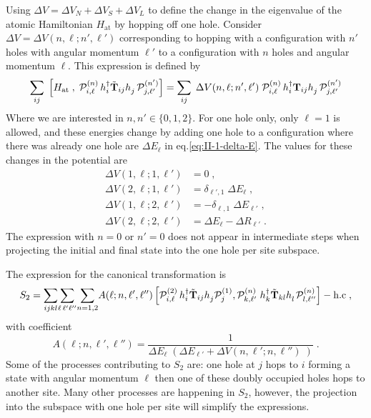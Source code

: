 Using $\Delta V=\Delta V_{N}+\Delta V_{S}+\Delta V_L$ to define the change in the eigenvalue of the atomic Hamiltonian $H_{\mathrm{at}}$ by hopping off one hole. Consider $\Delta V = \Delta V(n,\ell; n',\ell')$ corresponding to hopping with a configuration with $n'$ holes with angular momentum $\ell'$ to a configuration with $n$ holes and angular momentum $\ell$. This expression is defined by
\begin{equation}
    \sum_{ij} \; \left[ H_{\mathrm{at}} \; , \; \cP_{i,\ell}^{(n)} \, h_i^\dagger   \tilde{\mb{T}}_{ij} h_j^\pd \, \cP_{j,\ell'}^{(n')} \right]
    =
    \sum_{ij} \;    \Delta V(n,\ell; n',\ell')
    \; \cP_{i,\ell}^{(n)} \, h_i^\dagger  \mb{T}_{ij}  h_j^\pd \, \cP_{j,\ell'}^{(n')}
\end{equation}
Where we are interested in $n,n' \in \{ 0,1,2 \}$. For one hole only, only $\ell=1$ is allowed, and these energies change by adding one hole to a configuration where there was already one hole are $\Delta E_\ell$ in eq.\eqref{eq:II-1-delta-E}.
The values for these changes in the potential are
\begin{align}
    \Delta V(1,\ell; 1,\ell') &= 0 \; , \\
    \Delta V(2,\ell; 1,\ell') &= \delta_{\ell',1}  \; \Delta E_{\ell} \; , \\
    \Delta V(1,\ell; 2,\ell') &= -\delta_{\ell,1}  \; \Delta E_{\ell'} \; , \\
    \Delta V(2,\ell; 2,\ell') &= \Delta E_{\ell} - \Delta R_{\ell'} \; .
\end{align}
The expression with $n=0$ or $n'=0$ does not appear in intermediate steps when projecting the initial and final state into the one hole per site subspace.

The expression for the canonical transformation is
\begin{equation}
    S_2 =    \sum_{ijkl}\!\sum_{\ell\,\ell'\ell''}\!\sum_{n=1,2}\!
    A(\ell;n,\ell',\ell'')
    \left[
    \mathcal{P}^{(2)}_{i,\ell} \, h_i^\dagger  \tilde{\mathbf{T}}_{ij} h_j^{\phantom{\dagger}}  \mathcal{P}^{(1)}_{j}  ,\cP_{k,\ell'}^{(n)} \; h_k^\dagger  \tilde{\mb{T}}_{kl}  h_l^\pd  \cP_{l,\ell''}^{(n)}
    \right]
    - \mathrm{h.c} \; ,  \label{eq:S2}
\end{equation}
with coefficient
\begin{equation}
    A(\ell;n,\ell',\ell'') =  \frac{1}{\Delta E_\ell \; \left( \Delta E_{\ell'} + \Delta V(n,\ell';n,\ell'') \; \right)} \; .
\end{equation}
Some of the processes contributing to $S_2$ are: one hole at $j$ hops to $i$ forming a state with angular momentum $\ell$ then one of these doubly occupied holes hops to another site. Many other processes are happening in $S_2$, however, the projection into the subspace with one hole per site will simplify the expressions.







